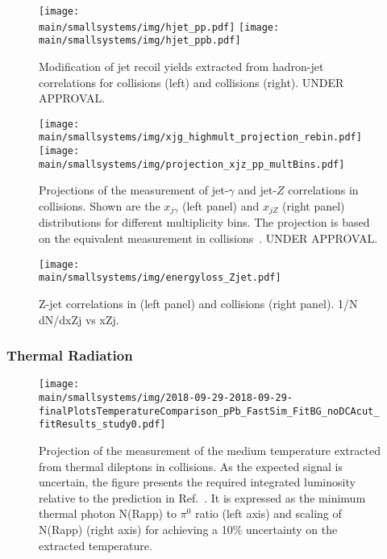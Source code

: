 \documentclass[../report.tex]{subfiles}
\providecommand{\main}{..}
\begin{document}
\begin{figure}[ht]
\centering
\texttt{[image: \\main/smallsystems/img/hjet\_pp.pdf]}
\hfill
\texttt{[image: \\main/smallsystems/img/hjet\_ppb.pdf]}
\caption{Modification of jet recoil yields extracted from hadron-jet correlations for \pp collisions (left) and \pPb collisions (right). UNDER APPROVAL.}
\label{fig:smallsystems_energyloss_hjet}
\end{figure}

\begin{figure}[ht]
\centering
\texttt{[image: \\main/smallsystems/img/xjg\_highmult\_projection\_rebin.pdf]}
\hfill
\texttt{[image: \\main/smallsystems/img/projection\_xjz\_pp\_multBins.pdf]}
\caption{Projections of the measurement of jet-$\gamma$ and jet-$Z$ correlations in \pp collisions. Shown are the $x_{j\gamma}$ (left panel) and $x_{jZ}$ (right panel) distributions for different multiplicity bins. The projection is based on the equivalent measurement in \pPb collisions~\cite{}. UNDER APPROVAL.} 
\label{fig:smallsystems_energyloss_xjg}
\end{figure}

\begin{figure}[ht]
\centering
\texttt{[image: \\main/smallsystems/img/energyloss\_Zjet.pdf]}

\caption{Z-jet correlations in \pp (left panel) and \pPb collisions (right panel). 1/N dN/dxZj vs xZj.}
\label{fig:smallsystems_energyloss_Zjet}
\end{figure}

\subsubsection{Thermal Radiation}

\begin{figure}[ht]
\centering
\texttt{[image: \\main/smallsystems/img/2018-09-29-2018-09-29-finalPlotsTemperatureComparison\_pPb\_FastSim\_FitBG\_noDCAcut\_fitResults\_study0.pdf]}
\caption{Projection of the measurement of the medium temperature extracted from thermal dileptons in \pPb collisions. As the expected signal is uncertain, the figure presents the required integrated luminosity relative to the prediction in Ref.~\cite{}. It is expressed as the minimum thermal photon N(Rapp) to $\pi^0$ ratio (left axis) and scaling of N(Rapp) (right axis) for achieving a 10\% uncertainty on the extracted temperature.}
\label{fig:smallsystems_thermal_radition}
\end{figure}
\end{document}
